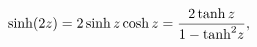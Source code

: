\[\mathop{\sinh\/}\nolimits\!\left(2z\right)=2\mathop{\sinh\/}\nolimits z\mathop%
{\cosh\/}\nolimits z=\frac{2\mathop{\tanh\/}\nolimits z}{1-{\mathop{\tanh\/}%
\nolimits^{2}}z},\]